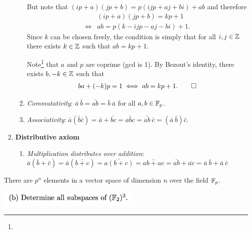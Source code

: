 \documentclass[12pt]{article}
\begin{document}
\begin{mdframed}
\begin{enumerate}
\begin{enumerate}
      But note that $(ip + a)(jp + b) = p(ijp + aj + bi) + ab$ and therefore
      \begin{align*}
        &(ip + a)(jp + b) = kp + 1\\
        \iff &ab = p(k - ijp - aj - bi) + 1.
      \end{align*}
      Since $k$ can be chosen freely, the condition is simply that for all
      $i, j \in \mathbb{Z}$ there exists $k \in \mathbb{Z}$ such that $ab = kp + 1$.

      Note\footnote{} that $a$ and
      $p$ are coprime (gcd is 1). By Bezout's identity, there exists
      $b, -k \in \mathbb{Z}$ such that
      \begin{align*}
        ba + (-k)p = 1 \iff ab = kp + 1. \qed
      \end{align*}


    \item \textit{Commutativity}:
      $\bar a ~ \bar b = \bar{ab} = \bar{b} ~ \bar{a}$ for all $a, b \in \mathbb{F}_p$.
    \item \textit{Associativity}:
      $\bar a (\bar b \bar c) = \bar a + \bar {bc} = \bar{abc} =
      \bar{ab}~\bar{c} = (\bar a ~ \bar b) \bar{c}$.
    \end{enumerate}
  \item \textbf{Distributive axiom}
    \begin{enumerate}
    \item \textit{Multiplication distributes over addition}: $\bar a (\bar b + \bar c) = \bar a (\bar{b + c}) = \bar{a(b+c)} = \bar{ab +
      ac} = \bar{ab} + \bar{ac} = \bar{a}~\bar{b} + \bar{a}~\bar{c}$
    \end{enumerate}
  \end{enumerate}

There are $p^n$ elements in a vector space of dimension $n$ over the field $\mathbb{F}_p$.
\end{mdframed}
\includegraphics[width=200pt]{img/linear-algebra-a0-1-1-b.png}
\end{document}
